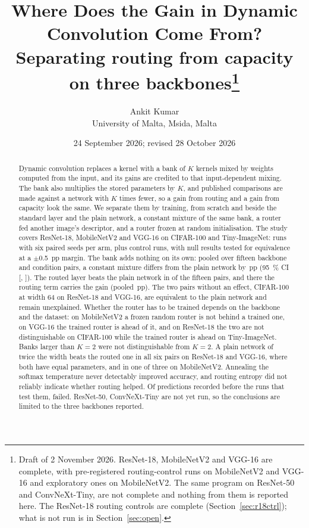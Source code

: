 \documentclass[10pt,a4paper]{article}
\title{\vspace{-1.3cm}\textbf{Where Does the Gain in Dynamic Convolution Come From?}\\[3pt]
\large Separating routing from capacity on three backbones\thanks{Draft of 2 November 2026. ResNet-18, MobileNetV2 and VGG-16 are complete, with \V{ctruns} pre-registered routing-control runs on MobileNetV2 and VGG-16 and \V{ctDruns} exploratory ones on MobileNetV2. The same program on ResNet-50 and ConvNeXt-Tiny, are not complete and nothing from them is reported here. The ResNet-18 routing controls are complete (Section~\ref{sec:r18ctrl}); what is not run is in Section~\ref{sec:open}.}}
\author{Ankit Kumar\\\small University of Malta, Msida, Malta}
\date{\small 24 September 2026; revised 28 October 2026}
\begin{document}
\maketitle
\vspace{-0.6cm}

\begin{abstract}
\noindent
Dynamic convolution replaces a kernel with a bank of $K$ kernels mixed by
weights computed from the input, and its gains are credited to that
input-dependent mixing. The bank also multiplies the stored parameters by
$K$, and published comparisons are made against a network with $K$ times
fewer, so a gain from routing and a gain from capacity look the same. We
separate them by training, from scratch and beside the standard layer and
the plain network, a constant mixture of the same bank, a router fed
another image's descriptor, and a router frozen at random initialisation.
The study covers ResNet-18, MobileNetV2 and VGG-16 on CIFAR-100 and
Tiny-ImageNet:  runs with six paired seeds per arm, plus
 control runs, with null results tested for equivalence at a
$\pm$\SI{0.5}{pp} margin. The bank adds nothing on its own: pooled over
fifteen backbone and condition pairs, a constant mixture differs from the
plain network by \,pp (\SI{95}{\percent} CI [,
]). The routed layer beats the plain network in  of
the fifteen pairs, and there the routing term carries the gain (pooled
\,pp). The two pairs without an effect, CIFAR-100 at width 64 on
ResNet-18 and VGG-16, are equivalent to the plain network and remain
unexplained. Whether the router has to be trained depends on the backbone
and the dataset: on MobileNetV2 a frozen random router is not behind a trained
one, on VGG-16 the trained router is ahead of it, and on ResNet-18 the two are
not distinguishable on CIFAR-100 while the trained router is ahead on
Tiny-ImageNet. Banks larger than
$K=2$ were not distinguishable from $K=2$. A plain network of twice the width
beats the routed one in all six pairs on ResNet-18 and VGG-16, where both
have equal parameters, and in one of three on MobileNetV2. Annealing the
softmax temperature never detectably improved accuracy, and routing entropy
did not reliably indicate whether routing helped. Of  predictions
recorded before the runs that test them,  failed. ResNet-50,
ConvNeXt-Tiny are not yet run, so the
conclusions are limited to the three backbones reported.
\end{abstract}
\end{document}

